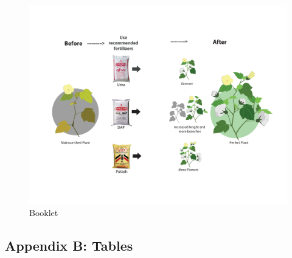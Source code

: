 \documentclass{article}
\begin{document}
\FloatBarrier

\pagebreak
\clearpage

\begin{figure}[!htb] \centering \caption{Booklet} \label{f:shc_booklet}
\includegraphics[width=0.9\linewidth]{figures/shc/booklet} 
\end{figure}

\FloatBarrier

\pagebreak
\clearpage

\begin{center}
\section*{Appendix B: Tables}
\end{center}

\setcounter{table}{0}
\renewcommand{\tablename}{}\renewcommand{\thetable}{Appendix Table \arabic{table}}
\FloatBarrier
\end{document}
